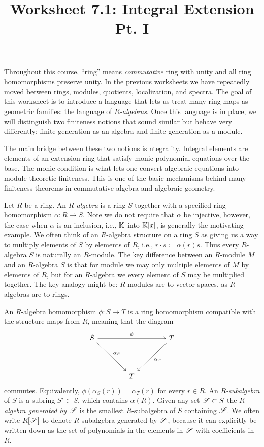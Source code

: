 \documentclass[12pt,reqno]{amsart}
\title{Worksheet 7.1: Integral Extension Pt. I}
\begin{document}

\maketitle
\thispagestyle{firstpage}
Throughout this course, ``ring'' means \textit{commutative} ring with unity and all ring homomorphisms preserve unity. In the previous worksheets we have repeatedly moved between rings, modules, quotients, localization, and spectra. The goal of this worksheet is to introduce a language that lets us treat many ring maps as geometric families: the language of \emph{$R$-algebras}. Once this language is in place, we will distinguish two finiteness notions that sound similar but behave very differently: finite generation as an algebra and finite generation as a module.

The main bridge between these two notions is ntegrality. Integral elements are elements of an extension ring that satisfy monic polynomial equations over the base. The monic condition is what lets one convert algebraic equations into module-theoretic finiteness. This is one of the basic mechanisms behind many finiteness theorems in commutative algebra and algebraic geometry.


Let $R$ be a ring. An \emph{$R$-algebra} is a ring $S$ together with a specified ring homomorphism $\alpha:R\longrightarrow S$. Note we do not require that $\alpha$ be injective, however, the case when $\alpha$ is an inclusion, i.e., $\mathbb{K}$ into $\mathbb{K}[x]$, is generally the motivating example. We often think of an $R$-algebra structure on a ring $S$ as giving us a way to multiply elements of $S$ by elements of $R$, i.e., $r \cdot s \coloneqq \alpha(r)s$. Thus every $R$-algebra $S$ is naturally an $R$-module. The key difference between an $R$-module $M$ and an $R$-algebra $S$ is that for module we may only multiple elements of $M$ by elements of $R$, but for an $R$-algebra we every element of $S$ may be multiplied together. The key analogy might be: $R$-modules are to vector spaces, as $R$-algebras are to rings. 

An $R$-algebra homomorphism $\phi:S\to T$ is a ring homomorphism compatible with the structure maps from $R$, meaning that the diagram
\[
\begin{tikzcd}[row sep=4em, column sep=4em]
S \arrow[rr, "\phi"] \arrow[dr, "\alpha_{S}"]& & T \arrow[dl, "\alpha_{T}"] \\
& T &
\end{tikzcd}
\]
commutes. Equivalently, $\phi(\alpha_S(r))=\alpha_{T}(r)$ for every $r\in R$. An \emph{$R$-subalgebra} of $S$ is a subring $S' \subset S$, which contains $\alpha(R)$. Given any set $\mathcal{S} \subset S$ the \emph{$R$-algebra generated by $\mathcal{S}$} is the smallest $R$-subalgebra of $S$ containing $\mathcal{S}$. We often write $R[\mathcal{S}]$ to denote $R$-subalgebra generated by $\mathcal{S}$, because it can explicitly be written down as the set of polynomials in the elements in $\mathcal{S}$ with coefficients in $R$.  
\end{document}
